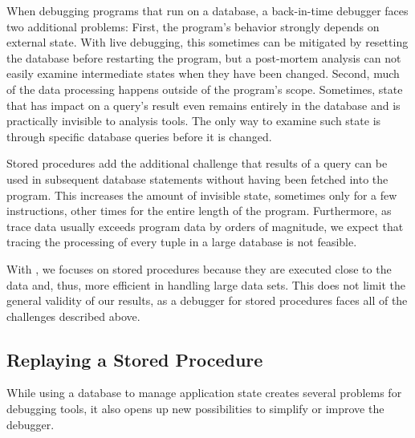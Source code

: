 When debugging programs that run on a database, a back-in-time debugger faces two additional problems:
First, the program's behavior strongly depends on external state.
With live debugging, this sometimes can be mitigated by resetting the database before restarting the program, but a post-mortem analysis can not easily examine intermediate states when they have been changed.
Second, much of the data processing happens outside of the program's scope.
Sometimes, state that has impact on a query's result even remains entirely in the database and is practically invisible to analysis tools.
The only way to examine such state is through specific database queries before it is changed.

Stored procedures add the additional challenge that results of a query can be used in subsequent database statements without having been fetched into the program.
This increases the amount of invisible state, sometimes only for a few instructions, other times for the entire length of the program.
Furthermore, as trace data usually exceeds program data by orders of magnitude, we expect that tracing the processing of every tuple in a large database is not feasible.

With \tool, we focuses on stored procedures because they are executed close to the data and, thus, more efficient in handling large data sets.
This does not limit the general validity of our results, as a debugger for stored procedures faces all of the challenges described above.



\subsection{Replaying a Stored Procedure}

While using a database to manage application state creates several problems for debugging tools, it also opens up new possibilities to simplify or improve the debugger.

